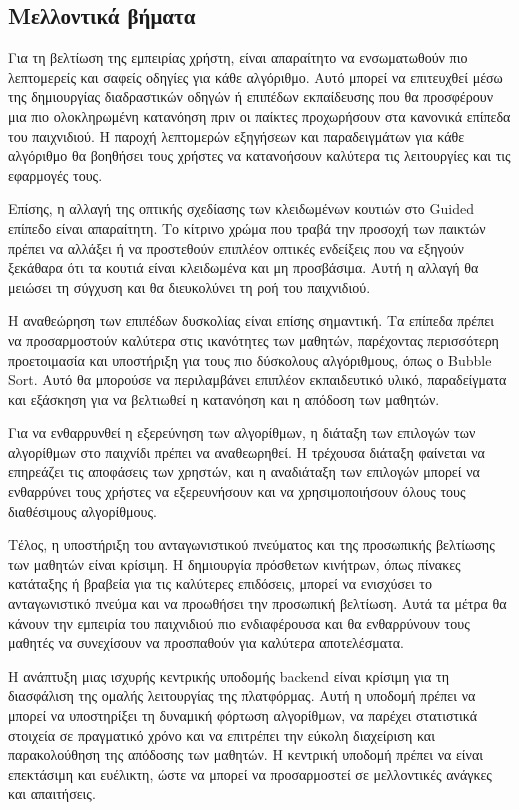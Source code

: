 
\subsection{Μελλοντικά βήματα}

Για τη βελτίωση της εμπειρίας χρήστη, είναι απαραίτητο να ενσωματωθούν πιο λεπτομερείς και σαφείς οδηγίες για κάθε αλγόριθμο. Αυτό μπορεί να επιτευχθεί μέσω της δημιουργίας διαδραστικών οδηγών ή επιπέδων εκπαίδευσης που θα προσφέρουν μια πιο ολοκληρωμένη κατανόηση πριν οι παίκτες προχωρήσουν στα κανονικά επίπεδα του παιχνιδιού. Η παροχή λεπτομερών εξηγήσεων και παραδειγμάτων για κάθε αλγόριθμο θα βοηθήσει τους χρήστες να κατανοήσουν καλύτερα τις λειτουργίες και τις εφαρμογές τους.

Επίσης, η αλλαγή της οπτικής σχεδίασης των κλειδωμένων κουτιών στο Guided επίπεδο είναι απαραίτητη. Το κίτρινο χρώμα που τραβά την προσοχή των παικτών πρέπει να αλλάξει ή να προστεθούν επιπλέον οπτικές ενδείξεις που να εξηγούν ξεκάθαρα ότι τα κουτιά είναι κλειδωμένα και μη προσβάσιμα. Αυτή η αλλαγή θα μειώσει τη σύγχυση και θα διευκολύνει τη ροή του παιχνιδιού.

Η αναθεώρηση των επιπέδων δυσκολίας είναι επίσης σημαντική. Τα επίπεδα πρέπει να προσαρμοστούν καλύτερα στις ικανότητες των μαθητών, παρέχοντας περισσότερη προετοιμασία και υποστήριξη για τους πιο δύσκολους αλγόριθμους, όπως ο Bubble Sort. Αυτό θα μπορούσε να περιλαμβάνει επιπλέον εκπαιδευτικό υλικό, παραδείγματα και εξάσκηση για να βελτιωθεί η κατανόηση και η απόδοση των μαθητών.

Για να ενθαρρυνθεί η εξερεύνηση των αλγορίθμων, η διάταξη των επιλογών των αλγορίθμων στο παιχνίδι πρέπει να αναθεωρηθεί. Η τρέχουσα διάταξη φαίνεται να επηρεάζει τις αποφάσεις των χρηστών, και η αναδιάταξη των επιλογών μπορεί να ενθαρρύνει τους χρήστες να εξερευνήσουν και να χρησιμοποιήσουν όλους τους διαθέσιμους αλγορίθμους.

Τέλος, η υποστήριξη του ανταγωνιστικού πνεύματος και της προσωπικής βελτίωσης των μαθητών είναι κρίσιμη. Η δημιουργία πρόσθετων κινήτρων, όπως πίνακες κατάταξης ή βραβεία για τις καλύτερες επιδόσεις, μπορεί να ενισχύσει το ανταγωνιστικό πνεύμα και να προωθήσει την προσωπική βελτίωση. Αυτά τα μέτρα θα κάνουν την εμπειρία του παιχνιδιού πιο ενδιαφέρουσα και θα ενθαρρύνουν τους μαθητές να συνεχίσουν να προσπαθούν για καλύτερα αποτελέσματα.

Η ανάπτυξη μιας ισχυρής κεντρικής υποδομής \gls{backend} είναι κρίσιμη για τη διασφάλιση της ομαλής λειτουργίας της πλατφόρμας. Αυτή η υποδομή πρέπει να μπορεί να υποστηρίξει τη δυναμική φόρτωση αλγορίθμων, να παρέχει στατιστικά στοιχεία σε πραγματικό χρόνο και να επιτρέπει την εύκολη διαχείριση και παρακολούθηση της απόδοσης των μαθητών. Η κεντρική υποδομή πρέπει να είναι επεκτάσιμη και ευέλικτη, ώστε να μπορεί να προσαρμοστεί σε μελλοντικές ανάγκες και απαιτήσεις.

